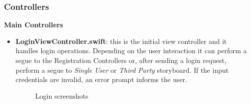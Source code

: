 \documentclass[titlepage]{article}
\begin{document}
	\subsubsection{Controllers}
	{\bf Main Controllers}
	\begin{itemize}
		\item {\bf LoginViewController.swift}: this is the initial view controller and it handles login operations. Depending on the user interaction it can perform a segue to the Registration Controllers or, after sending a login request, perform a segue to {\it Single User} or {\it Third Party} storyboard. If the input credentials are invalid, an error prompt informs the user.
		
		\begin{figure}[H]%
			\centering
			\qquad
			\caption{Login screenshots}%
			\label{fig:RequestTab}%
		\end{figure}
		

\end{itemize}
\end{document}
